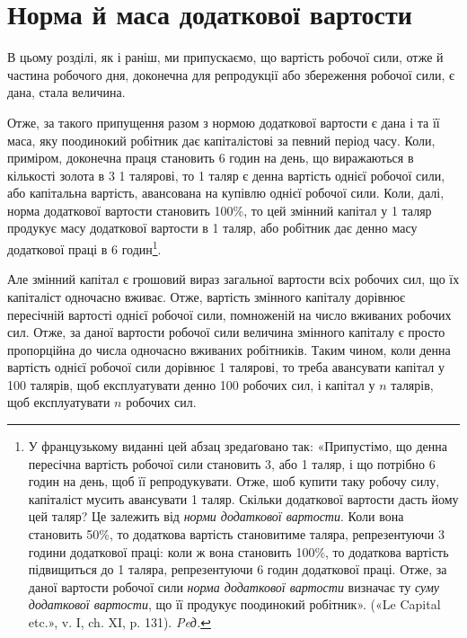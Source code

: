 
\section{Норма й маса додаткової вартости}

В цьому розділі, як і раніш, ми припускаємо, що вартість
робочої сили, отже й частина робочого дня, доконечна для репродукції
або збереження робочої сили, є дана, стала величина.

Отже, за такого припущення разом з нормою додаткової вартости
є дана і та її маса, яку поодинокий робітник дає капіталістові
за певний період часу. Коли, приміром, доконечна праця
становить 6 годин на день, що виражаються в кількості золота
в 3 \deq{} 1 талярові, то 1 таляр є денна вартість однієї
робочої сили, або капітальна вартість, авансована на купівлю
однієї робочої сили. Коли, далі, норма додаткової вартости становить
100\%, то цей змінний капітал у 1 таляр продукує масу
додаткової вартости в 1 таляр, або робітник дає денно масу додаткової
праці в 6 годин\footnote*{
У французькому виданні цей абзац зредаґовано так: «Припустімо,
що денна пересічна вартість робочої сили становить 3, або 1 таляр,
і що потрібно 6 годин на день, щоб її репродукувати. Отже, шоб
купити таку робочу силу, капіталіст мусить авансувати 1 таляр. Скільки
додаткової вартости дасть йому цей таляр? Це залежить від \emph{норми додаткової
вартости}. Коли вона становить 50\%, то додаткова вартість становитиме
 таляра, репрезентуючи 3 години додаткової праці: коли ж вона
становить 100\%, то додаткова вартість підвищиться до 1 таляра, репрезентуючи
6 годин додаткової праці. Отже, за даної вартости робочої сили
\emph{норма додаткової вартости} визначає ту \emph{суму додаткової вартости}, що її
продукує поодинокий робітник». («Le Capital etc.», v. I, ch. XI, p. 131). \emph{Peд.}
}.

Але змінний капітал є грошовий вираз загальної вартости всіх
робочих сил, що їх капіталіст одночасно вживає. Отже, вартість
змінного капіталу дорівнює пересічній вартості однієї робочої
сили, помноженій на число вживаних робочих сил. Отже, за даної
вартости робочої сили величина змінного капіталу є просто пропорційна
до числа одночасно вживаних робітників. Таким чином,
коли денна вартість однієї робочої сили дорівнює 1 талярові, то
треба авансувати капітал у 100 талярів, щоб експлуатувати денно
100 робочих сил, і капітал у $n$ талярів, щоб експлуатувати $n$ робочих
сил.

